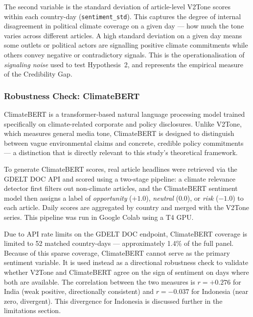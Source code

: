\documentclass[12pt,a4paper]{article}
\begin{document}
The second variable is the standard deviation of article-level V2Tone scores within each country-day (\texttt{sentiment\_std}). This captures the degree of internal disagreement in political climate coverage on a given day --- how much the tone varies across different articles. A high standard deviation on a given day means some outlets or political actors are signalling positive climate commitments while others convey negative or contradictory signals. This is the operationalisation of \textit{signaling noise} used to test Hypothesis~2, and represents the empirical measure of the Credibility Gap.

\subsubsection{Robustness Check: ClimateBERT}

ClimateBERT \citep{Webersinke2022} is a transformer-based natural language processing model trained specifically on climate-related corporate and policy disclosures. Unlike V2Tone, which measures general media tone, ClimateBERT is designed to distinguish between vague environmental claims and concrete, credible policy commitments --- a distinction that is directly relevant to this study's theoretical framework.

To generate ClimateBERT scores, real article headlines were retrieved via the GDELT DOC API and scored using a two-stage pipeline: a climate relevance detector first filters out non-climate articles, and the ClimateBERT sentiment model then assigns a label of \textit{opportunity} ($+1.0$), \textit{neutral} ($0.0$), or \textit{risk} ($-1.0$) to each article. Daily scores are aggregated by country and merged with the V2Tone series. This pipeline was run in Google Colab using a T4 GPU.

Due to API rate limits on the GDELT DOC endpoint, ClimateBERT coverage is limited to 52 matched country-days --- approximately 1.4\% of the full panel. Because of this sparse coverage, ClimateBERT cannot serve as the primary sentiment variable. It is used instead as a directional robustness check to validate whether V2Tone and ClimateBERT agree on the sign of sentiment on days where both are available. The correlation between the two measures is $r = +0.276$ for India (weak positive, directionally consistent) and $r = -0.037$ for Indonesia (near zero, divergent). This divergence for Indonesia is discussed further in the limitations section.
\end{document}
